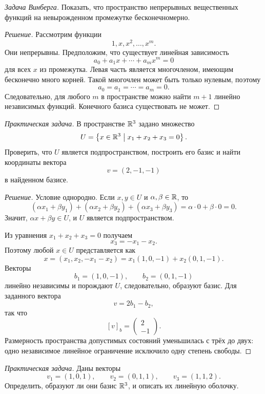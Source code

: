 \begin{problem}
\textit{Задача Винберга.}
Показать, что пространство непрерывных вещественных функций на невырожденном промежутке бесконечномерно.
\end{problem}

\begin{proof}[Решение]
Рассмотрим функции
\[
1,x,x^2,\dots,x^m.
\]
Они непрерывны. Предположим, что существует линейная зависимость
\[
a_0+a_1x+\cdots+a_mx^m=0
\]
для всех \(x\) из промежутка. Левая часть является многочленом, имеющим бесконечно много корней. Такой многочлен может быть только нулевым, поэтому
\[
a_0=a_1=\cdots=a_m=0.
\]
Следовательно, для любого \(m\) в пространстве можно найти \(m+1\) линейно независимых функций. Конечного базиса существовать не может.
\end{proof}

\begin{problem}
\textit{Практическая задача.}
В пространстве \(\mathbb{R}^3\) задано множество
\[
U=\left\{x\in\mathbb{R}^3\;\middle|\;x_1+x_2+x_3=0\right\}.
\]
Проверить, что \(U\) является подпространством, построить его базис и найти координаты вектора
\[
v=(2,-1,-1)
\]
в найденном базисе.
\end{problem}

\begin{proof}[Решение]
Условие однородно. Если \(x,y\in U\) и \(\alpha,\beta\in\mathbb{R}\), то
\[
(\alpha x_1+\beta y_1)
+(\alpha x_2+\beta y_2)
+(\alpha x_3+\beta y_3)
=
\alpha\cdot 0+\beta\cdot 0=0.
\]
Значит, \(\alpha x+\beta y\in U\), и \(U\) является подпространством.

Из уравнения \(x_1+x_2+x_3=0\) получаем
\[
x_3=-x_1-x_2.
\]
Поэтому любой \(x\in U\) представляется как
\[
x=(x_1,x_2,-x_1-x_2)
=x_1(1,0,-1)+x_2(0,1,-1).
\]
Векторы
\[
b_1=(1,0,-1),
\qquad
b_2=(0,1,-1)
\]
линейно независимы и порождают \(U\), следовательно, образуют базис. Для заданного вектора
\[
v=2b_1-b_2,
\]
так что
\[
[v]_b=
\begin{pmatrix}
2\\-1
\end{pmatrix}.
\]
Размерность пространства допустимых состояний уменьшилась с трёх до двух: одно независимое линейное ограничение исключило одну степень свободы.
\end{proof}

\begin{problem}
\textit{Практическая задача.}
Даны векторы
\[
v_1=(1,0,1),
\qquad
v_2=(0,1,1),
\qquad
v_3=(1,1,2).
\]
Определить, образуют ли они базис \(\mathbb{R}^3\), и описать их линейную оболочку.
\end{problem}

